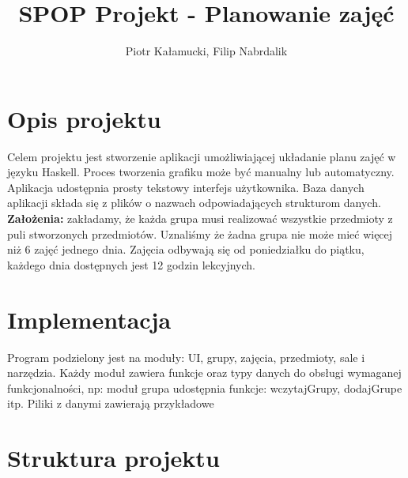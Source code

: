 \documentclass[12pt,a4paper]{article}
\author{Piotr Kałamucki, Filip Nabrdalik}
\title{SPOP Projekt - Planowanie zajęć}
\begin{document}
\maketitle
\thispagestyle{empty}
\pagestyle{empty}
\section{Opis projektu}
Celem projektu jest stworzenie aplikacji umożliwiającej układanie planu zajęć w języku Haskell. Proces tworzenia grafiku może być manualny lub automatyczny. Aplikacja udostępnia prosty tekstowy interfejs użytkownika. Baza danych aplikacji składa się z plików o nazwach odpowiadających strukturom danych.
\textbf{Założenia:} zakładamy, że każda grupa musi realizować wszystkie przedmioty z puli stworzonych przedmiotów. Uznaliśmy że żadna grupa nie może mieć więcej niż 6 zajęć jednego dnia. Zajęcia odbywają się od poniedziałku do piątku, każdego dnia dostępnych jest 12 godzin lekcyjnych.
\section{Implementacja}
Program podzielony jest na moduły: UI, grupy, zajęcia, przedmioty, sale i narzędzia. Każdy moduł zawiera funkcje oraz typy danych do obsługi wymaganej funkcjonalności, np: moduł grupa udostępnia funkcje: wczytajGrupy, dodajGrupe itp. Piliki z danymi zawierają przykładowe 
\section{Struktura projektu}
\end{document}
